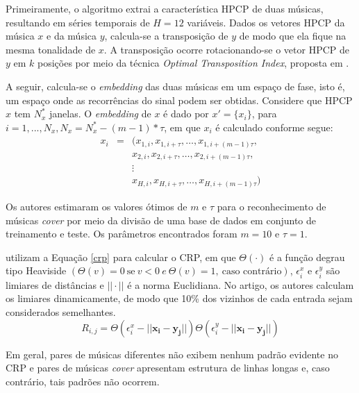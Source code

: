 Primeiramente, o algoritmo extrai a característica HPCP \cite{gomez2006} de duas músicas, resultando em séries temporais de \({H = 12}\) variáveis. Dados os vetores HPCP da música \textbf{\({x}\)} e da música \textbf{\({y}\)}, calcula-se a transposição de \textbf{\({y}\)} de modo que ela fique na mesma tonalidade de \textbf{\({x}\)}. A transposição ocorre rotacionando-se o vetor HPCP de \textbf{\({y}\)} em \({k}\) posições por meio da técnica \textit{Optimal Transposition Index}, proposta em \cite{serra2009}.

A seguir, calcula-se o \textit{embedding} das duas músicas em um espaço de fase, isto é, um espaço onde as recorrências do sinal podem ser obtidas. Considere que  HPCP \textbf{\({x}\)} tem \({N_{x}^{*}}\) janelas. O \textit{embedding} de \textbf{\({x}\)} é dado por \({x' = \big\{x_{i}\big\}}\), para \({i = 1, ..., N_{x}, N_{x} = N_{x}^{*} - (m - 1)*\tau}\), em que \({x_{i}}\) é calculado conforme segue:
\begin{eqnarray} \label{embedding}
    x_{i} &=& (x_{1,i},x_{1,i+\tau}, \ldots, x_{1,i+(m-1)\tau}, \\
          & & x_{2,i},x_{2,i+\tau}, \ldots, x_{2,i+(m-1)\tau}, \nonumber \\
          & & \vdots \nonumber \\
          & & x_{H,i},x_{H,i+\tau}, \ldots, x_{H,i+(m-1)\tau}) \nonumber
\end{eqnarray}

Os autores estimaram os valores ótimos de \({m}\) e \({\tau}\) para o reconhecimento de músicas \textit{cover} por meio da divisão de uma base de dados em conjunto de treinamento e teste. Os parâmetros encontrados foram \({m = 10}\) e \({\tau = 1}\).

 utilizam a Equação \ref{crp} para calcular o CRP, em que \({\Theta(\cdot)}\) é a função degrau tipo Heaviside \({(\Theta(v) = 0 \ \textrm{se} \ v < 0 \  e \  \Theta(v) = 1, \ \textrm{caso contrário})}\), \({\epsilon_{i}^{x}}\) e \({\epsilon_{i}^{y}}\) são limiares de distâncias e \({|| \cdot ||}\) é a norma Euclidiana. No artigo, os autores calculam os limiares dinamicamente, de modo que 10\% dos vizinhos de cada entrada sejam considerados semelhantes.
\begin{equation} \label{crp}
    R_{i,j} = \Theta(\epsilon_{i}^{x} - ||\mathbf{x_{i} - y_{j}}||)\Theta(\epsilon_{i}^{y} - ||\mathbf{x_{i} - y_{j}}||)
\end{equation}

Em geral, pares de músicas diferentes não exibem nenhum padrão evidente no CRP e pares de músicas \textit{cover} apresentam estrutura de linhas longas e, caso contrário, tais padrões não ocorrem.

